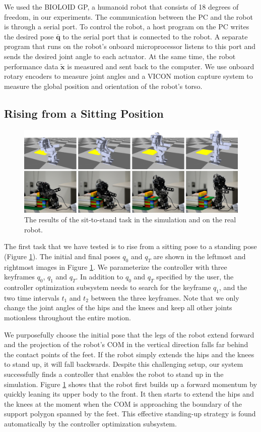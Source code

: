 We used the BIOLOID GP, a humanoid robot that consists of 18 degrees of freedom, in our experiments. The communication between the PC and the robot is through a serial port. To control the robot, a host program on the PC writes the desired pose $\bar{\mathbf{q}}$ to the serial port that is connected to the robot. A separate program that runs on the robot's onboard microprocessor listens to this port and sends the desired joint angle to each actuator. At the same time, the robot performance data $\tilde{\mathbf{x}}$ is measured and sent back to the computer. We use onboard rotary encoders to measure joint angles and a VICON motion capture system to measure the global position and orientation of the robot's torso.

\subsection{Rising from a Sitting Position}

\begin{figure}[!t]
  \centering
  \includegraphics[width=\textwidth]{figures/sit2Stand}
  \caption{The results of the sit-to-stand task in the simulation and on the real robot.}
  \label{fig:sit2Stand}
\end{figure}

The first task that we have tested is to rise from a sitting pose to a standing pose (Figure \ref{fig:sit2Stand}). The initial and final poses $q_0$ and $q_T$ are shown in the leftmost and rightmost images in Figure \ref{fig:sit2Stand}. We parameterize the controller with three keyframes $q_0$, $q_1$ and $q_T$. In addition to $q_0$ and $q_T$ specified by the user, the controller optimization subsystem needs to search for the keyframe $q_1$, and the two time intervals $t_1$ and $t_2$ between the three keyframes. Note that we only change the joint angles of the hips and the knees and keep all other joints motionless throughout the entire motion.

We purposefully choose the initial pose that the legs of the robot extend forward and the projection of the robot's COM in the vertical direction falls far behind the contact points of the feet. If the robot simply extends the hips and the knees to stand up, it will fall backwards. Despite this challenging setup, our system successfully finds a controller that enables the robot to stand up in the simulation. Figure \ref{fig:sit2Stand} shows that the robot first builds up a forward momentum by quickly leaning its upper body to the front. It then starts to extend the hips and the knees at the moment when the COM is approaching the boundary of the support polygon spanned by the feet. This effective standing-up strategy is found automatically by the controller optimization subsystem.

